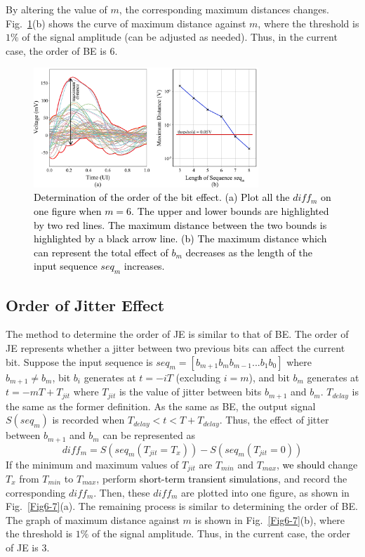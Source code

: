 \documentclass[conference]{IEEEtran}
\begin{document}
By altering the value of $m$, the corresponding maximum distances changes. Fig.~\ref{Fig4-5}(b) shows the curve of maximum distance against $m$,
\color{black}
where the threshold is $1\%$ of the signal amplitude (can be adjusted as needed). Thus, in the current case, the order of BE is $6$.

\begin{figure}[t]
\centerline{\includegraphics[width=240pt]{Fig4-5.png}}
\caption{\textcolor{black}{Determination of the order of the bit effect. (a) Plot all the $diff_m$ on one figure when $m=6$. The upper and lower bounds are highlighted by two red lines. The maximum distance between the two bounds is highlighted by a black arrow line. (b) The maximum distance which can represent the total effect of $b_m$ decreases as the length of the input sequence $seq_m$ increases.}}
\label{Fig4-5}
\end{figure}

\subsection{Order of Jitter Effect}\label{IIIB}

\color{black}
The method to determine the order of JE is similar to that of BE. The order of JE represents whether a jitter between two previous bits can affect the current bit. Suppose the input sequence is $seq_m=[b_{m+1}b_mb_{m-1}...b_1b_0]$ where $b_{m+1}\neq b_m$, bit $b_i$ generates at $t=-iT$ (excluding $i=m$), and bit $b_m$ generates at $t=-mT+T_{jit}$ where $T_{jit}$ is the value of jitter between bits $b_{m+1}$ and $b_m$.
\color{black}
$T_{delay}$ is the same as the former definition.
\color{black}
As the same as BE, the output signal $S(seq_m)$ is recorded when $T_{delay}<t<T+T_{delay}$. Thus, the effect of jitter between $b_{m+1}$ and $b_m$ can be represented as
\color{black}
\begin{equation}
diff_m=S(seq_m(T_{jit}=T_x))-S(seq_m(T_{jit}=0))
\label{eq2}
\end{equation}
If the minimum and maximum values of $T_{jit}$ are $T_{min}$ and $T_{max}$, \textcolor{black}{we should} change $T_x$ from $T_{min}$ to $T_{max}$, perform \textcolor{black}{short-term transient simulations}, and record the corresponding $diff_m$. Then, these $diff_m$ are plotted into one figure, as shown in Fig.~\ref{Fig6-7}(a). The remaining process is similar to determining the order of BE. The graph of maximum distance against $m$ is shown in Fig.~\ref{Fig6-7}(b), where the threshold is $1\%$ of the signal amplitude. Thus, in the current case, the order of JE is $3$.
\end{document}
